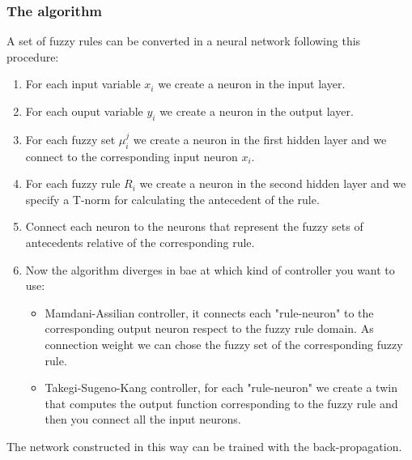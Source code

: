 \documentclass{article}
\begin{document}
\subsubsection{The algorithm}
A set of fuzzy rules can be converted in a neural network following this procedure:
\begin{enumerate}
    \item For each input variable $x_i$ we create a neuron in the input layer.
    \item For each ouput variable $y_i$ we create a neuron in the output layer.
    \item For each fuzzy set $\mu_i^j$ we create a neuron in the first hidden layer
    and we connect to the corresponding input neuron $x_i$.
    \item For each fuzzy rule $R_i$ we create a neuron in the second hidden layer
    and we specify a T-norm for calculating the antecedent of the rule.
    \item Connect each neuron to the neurons that represent the fuzzy sets of antecedents
    relative of the corresponding rule.
    \item Now the algorithm diverges in bae at which kind of controller you want to use:
    \begin{itemize}
        \item Mamdani-Assilian controller, it connects each "rule-neuron" to the corresponding
        output neuron respect to the fuzzy rule domain. As connection weight we can chose
        the fuzzy set of the corresponding fuzzy rule.
        \item Takegi-Sugeno-Kang controller, for each "rule-neuron" we create a twin that
        computes the output function corresponding to the fuzzy rule and then you connect
        all the input neurons.
    \end{itemize}
\end{enumerate}
The network constructed in this way can be trained with the back-propagation.
\end{document}
